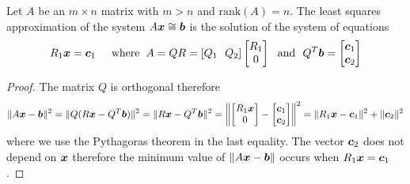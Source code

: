 \begin{proposition}
Let $A$ be an $m \times n$ matrix with $m > n$ and $\mathrm{rank}(A) = n$. The least squares approximation of the system $A \boldsymbol{x} \cong \boldsymbol{b}$ is the solution of the system of equations
$$
R_1\boldsymbol{x} = \boldsymbol{c}_1 \hspace{5mm} \text{where} \hspace{2mm} A = QR = [ Q_1 \ \ Q_2 ] \begin{bmatrix} R_1 \\ 0 \end{bmatrix} \ \ \text{and} \ \ Q^T\boldsymbol{b} = \begin{bmatrix} \boldsymbol{c}_1 \\ \boldsymbol{c}_2 \end{bmatrix}
$$
\begin{proof}
The matrix $Q$ is orthogonal therefore
$$
\| A \boldsymbol{x} - \boldsymbol{b} \|^2 = \| Q(R \boldsymbol{x} - Q^T\boldsymbol{b}) \|^2 = \| R \boldsymbol{x} - Q^T\boldsymbol{b} \|^2
= \left\| \begin{bmatrix} R_1\boldsymbol{x} \\ 0 \end{bmatrix} - \begin{bmatrix} \boldsymbol{c}_1 \\ \boldsymbol{c}_2 \end{bmatrix} \right\|^2
= \| R_1 \boldsymbol{x} - \boldsymbol{c}_1 \|^2 + \| \boldsymbol{c}_2 \|^2
$$
where we use the Pythagoras theorem in the last equality. The vector $\boldsymbol{c}_2$ does not depend on $\boldsymbol{x}$ therefore the minimum value of $\| A \boldsymbol{x} - \boldsymbol{b} \|$ occurs when $R_1 \boldsymbol{x} = \boldsymbol{c}_1$.
\end{proof}
\end{proposition}